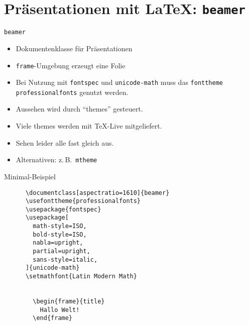 \section{Präsentationen mit \LaTeX: \texttt{beamer}}

\begin{frame}[fragile]{
  \texttt{beamer}
  \hfill
}
  \begin{itemize}
    \item Dokumentenklasse für Präsentationen
    \item \lstinline+frame+-Umgebung erzeugt eine Folie
    \item Bei Nutzung mit \lstinline+fontspec+ und \lstinline+unicode-math+ muss das \texttt{fonttheme} \texttt{professionalfonts} genutzt werden.
    \item Aussehen wird durch \enquote{themes} gesteuert.
    \item Viele themes werden mit \TeX-Live mitgeliefert.
    \item Sehen leider alle fast gleich aus.
    \item Alternativen: z.\,B.~\texttt{mtheme}
  \end{itemize}
\end{frame}

\begin{frame}[fragile]{Minimal-Beispiel}
  \begin{center}
    \begin{lstlisting}
      \documentclass[aspectratio=1610]{beamer}
      \usefonttheme{professionalfonts}
      \usepackage{fontspec}
      \usepackage[
        math-style=ISO,
        bold-style=ISO,
        nabla=upright,
        partial=upright,
        sans-style=italic,
      ]{unicode-math}
      \setmathfont{Latin Modern Math}

      
        \begin{frame}{title}
          Hallo Welt!
        \end{frame}
      
    \end{lstlisting}
  \end{center}
\end{frame}

